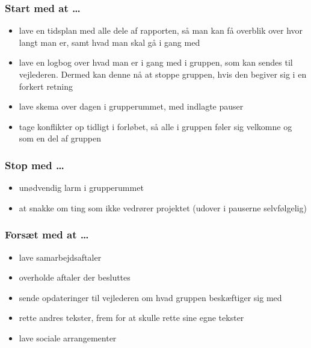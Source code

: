 \subsubsection*{Start med at \ldots}
\begin{itemize}
	\item lave en tidsplan med alle dele af rapporten, så man kan få overblik over hvor langt man er, samt hvad man skal gå i gang med
	\item lave en logbog over hvad man er i gang med i gruppen, som kan sendes til vejlederen. Dermed kan denne nå at stoppe gruppen, hvis den begiver sig i en forkert retning
	\item lave skema over dagen i grupperummet, med indlagte pauser
	\item tage konflikter op tidligt i forløbet, så alle i gruppen føler sig velkomne og som en del af gruppen
\end{itemize}
\subsubsection*{Stop med \ldots}
\begin{itemize}
	\item unødvendig larm i grupperummet
	\item at snakke om ting som ikke vedrører projektet (udover i pauserne selvfølgelig)
\end{itemize}
\subsubsection*{Forsæt med at \ldots}
\begin{itemize}
	\item lave samarbejdsaftaler
	\item overholde aftaler der besluttes
	\item sende opdateringer til vejlederen om hvad gruppen beskæftiger sig med
	\item rette andres tekster, frem for at skulle rette sine egne tekster
	\item lave sociale arrangementer
\end{itemize}